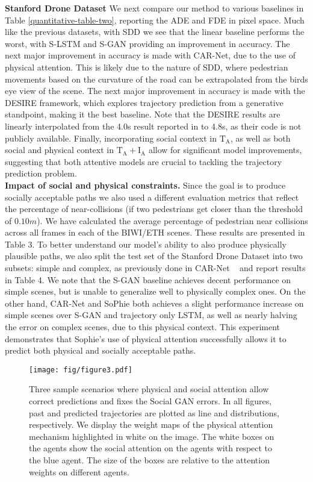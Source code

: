 \documentclass[10pt,twocolumn,letterpaper]{article}
\begin{document}
\textbf{Stanford Drone Dataset} We next compare our method to various baselines in Table \ref{quantitative-table-two}, reporting the ADE and FDE in pixel space. Much like the previous datasets, with SDD we see that the linear baseline performs the worst, with S-LSTM and S-GAN providing an improvement in accuracy. The next major improvement in accuracy is made with CAR-Net, due to the use of physical attention. This is likely due to the nature of SDD, where pedestrian movements based on the curvature of the road can be extrapolated from the birds eye view of the scene. The next major improvement in accuracy is made with the DESIRE framework, which explores trajectory prediction from a generative standpoint, making it the best baseline. Note that the DESIRE results are linearly interpolated from the 4.0s result reported in \cite{lee2017desire} to 4.8s, as their code is not publicly available. Finally, incorporating social context in $\mathrm{T_A}$, as well as both social and physical context in $\mathrm{T_A+I_A}$ allow for significant model improvements, suggesting that both attentive models are crucial to tackling the trajectory prediction problem.\\

\textbf{Impact of social and physical constraints.} Since the goal is to produce socially acceptable paths we also used a different evaluation metrics that reflect the percentage of near-collisions (if two pedestrians get closer than the threshold of $0.10m$). We have calculated the average percentage of pedestrian near collisions across all frames in each of the BIWI/ETH scenes. These results are presented in Table 3. To better understand our model's ability to also produce physically plausible paths, we also split the test set of the Stanford Drone Dataset into two subsets: simple and complex, as previously done in CAR-Net ~\cite{sadeghian2017car} and report results in Table 4. We note that the S-GAN baseline achieves decent performance on simple scenes, but is unable to generalize well to physically complex ones. On the other hand, CAR-Net and SoPhie both achieves a slight performance increase on simple scenes over S-GAN and trajectory only LSTM, as well as nearly halving the error on complex scenes, due to this physical context. This experiment demonstrates that Sophie's use of physical attention successfully allows it to predict both physical and socially acceptable paths.


\begin{figure*}[ht!]
  \centering
    \texttt{[image: fig/figure3.pdf]}
\caption{\small Three sample scenarios where physical and social attention allow correct predictions and fixes the Social GAN errors. In all figures, past and predicted trajectories are plotted as line and distributions, respectively. We display the weight maps of the physical attention mechanism highlighted in white on the image. The white boxes on the agents show the social attention on the agents with respect to the blue agent. The size of the boxes are relative to the attention weights on different agents.
} 
	\label{fig:qual1}
\end{figure*}
\end{document}
